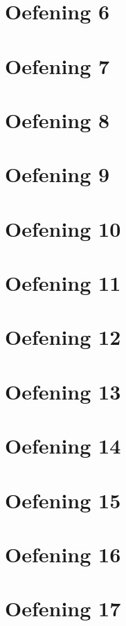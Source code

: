 \documentclass[a4paper,11pt]{report}
\begin{document}
\section{Oefening 6}

\section{Oefening 7}

\section{Oefening 8}

\section{Oefening 9}

\section{Oefening 10}

\section{Oefening 11}

\section{Oefening 12}

\section{Oefening 13}

\section{Oefening 14}

\section{Oefening 15}

\section{Oefening 16}

\section{Oefening 17}

\end{document}
